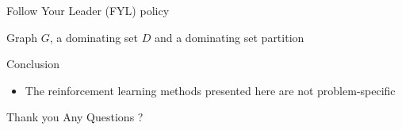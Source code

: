 \documentclass{beamer}
\begin{document}
\begin{frame}{Follow Your Leader (FYL) policy}
  \begin{algorithmic}
     Graph $G$, a dominating set $D$ and a dominating set partition
 \end{algorithmic}
\end{frame}

\begin{frame}{Conclusion}
\begin{itemize}
\item The reinforcement learning methods presented here are \alert{not problem-specific}\end{itemize}
\end{frame}


\begin{frame}{Thank you}
\centering \Huge Any Questions ?
\end{frame}

\begin{frame}
\AtNextBibliography{\tiny}
\printbibliography
\end{frame}
\end{document}

